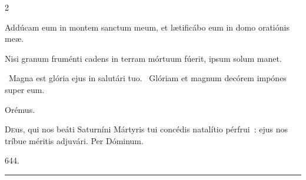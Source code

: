 \documentclass[9pt,twoside]{extarticle}
\begin{document}
\begin{multicols}{2}
\begin{tightlist}{}
\item {} Addúcam eum in montem sanctum meum, et lætificábo eum in domo oratiónis meæ. 
\item {}
\item {}
\item {} Nisi granum fruménti cadens in terram mórtuum fúerit, ipsum solum manet.
\item {}~Magna est glória ejus in salutári tuo. ~Glóriam et magnum decórem impónes super eum.
\item Orémus. \hfill {}
\end{tightlist}
\lettrine{D}eus, qui nos beáti Saturníni Mártyris tui concédis natalítio pérfrui~: ejus nos tríbue méritis adjuvári. Per Dóminum.

\begin{tightlist}{}
\item {}
\item {} 644.
\end{tightlist}

\begin{center}\textcolor{red}{\rule{\linewidth}{0.5pt}} \end{center}



\end{multicols}
\end{document}
